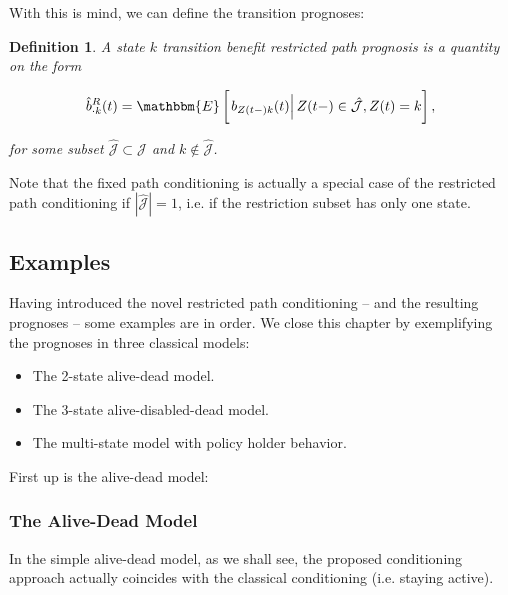 \documentclass{article}
\newcommand{\1}[1]{\mathbbm{1}_{\left\lbrace #1 \right\rbrace}}
\newcommand{\econd}[2][def]{\mathbbm{E} \left[ \left. #1 \right| #2 \right]}
\theoremstyle{break}
\newtheorem{definition}{Definition}[section]
\theoremstyle{remark}
\newenvironment{remark}
  {\pushQED{\qed}\renewcommand{\qedsymbol}{\scalebox{1.4}{$\circ$}}\remarkx}
  {\popQED\endremarkx}
\numberwithin{equation}{section}
\begin{document}
With this is mind, we can define the transition prognoses:

\begin{definition} \label{DefTraRestr}
	A state $k$ transition benefit restricted path prognosis is a quantity on the form
	
	\begin{gather*}
		\hat{b}_{\cdot k}^R(t) = \econd[b_{Z(t-)k}(t)]{Z(t-) \in \hat{\mathcal{J}}, Z(t)=k},
	\end{gather*}
	
	for some subset $\hat{\mathcal{J}} \subset \mathcal{J}$ and $k \notin \hat{\mathcal{J}}$.
\end{definition}

\begin{remark} \label{FixedRestricted}
	Note that the fixed path conditioning is actually a special case of the restricted path conditioning if $|\hat{\mathcal{J}}|=1$, i.e. if the restriction subset has only one state.
\end{remark}

\newpage

\subsection{Examples}

Having introduced the novel restricted path conditioning -- and the resulting prognoses -- some examples are in order. We close this chapter by exemplifying the prognoses in three classical models:

\begin{itemize}
	\item The 2-state alive-dead model.
	\item The 3-state alive-disabled-dead model.
	\item The multi-state model with policy holder behavior.
\end{itemize}

First up is the alive-dead model:

\subsubsection{The Alive-Dead Model} \label{ExampleOne}
In the simple alive-dead model, as we shall see, the proposed conditioning approach actually coincides with the classical conditioning (i.e. staying active).
\end{document}
